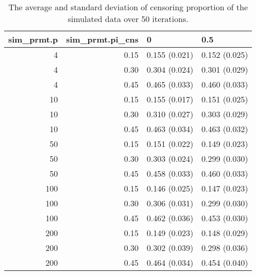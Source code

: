 \begin{table}[ht]
\centering
\begin{tabular}{rrll}
  \hline
sim\_prmt.p & sim\_prmt.pi\_cns & 0 & 0.5 \\ 
  \hline
  4 & 0.15 & 0.155 (0.021) & 0.152 (0.025) \\ 
    4 & 0.30 & 0.304 (0.024) & 0.301 (0.029) \\ 
    4 & 0.45 & 0.465 (0.033) & 0.460 (0.033) \\ 
   10 & 0.15 & 0.155 (0.017) & 0.151 (0.025) \\ 
   10 & 0.30 & 0.310 (0.027) & 0.303 (0.029) \\ 
   10 & 0.45 & 0.463 (0.034) & 0.463 (0.032) \\ 
   50 & 0.15 & 0.151 (0.022) & 0.149 (0.023) \\ 
   50 & 0.30 & 0.303 (0.024) & 0.299 (0.030) \\ 
   50 & 0.45 & 0.458 (0.033) & 0.460 (0.033) \\ 
  100 & 0.15 & 0.146 (0.025) & 0.147 (0.023) \\ 
  100 & 0.30 & 0.306 (0.031) & 0.299 (0.030) \\ 
  100 & 0.45 & 0.462 (0.036) & 0.453 (0.030) \\ 
  200 & 0.15 & 0.149 (0.023) & 0.148 (0.029) \\ 
  200 & 0.30 & 0.302 (0.039) & 0.298 (0.036) \\ 
  200 & 0.45 & 0.464 (0.034) & 0.454 (0.040) \\ 
   \hline
\end{tabular}
\caption{The average and standard deviation of censoring proportion of the simulated data over 50 iterations.} 
\label{tab:sim_cnr_prop}
\end{table}
